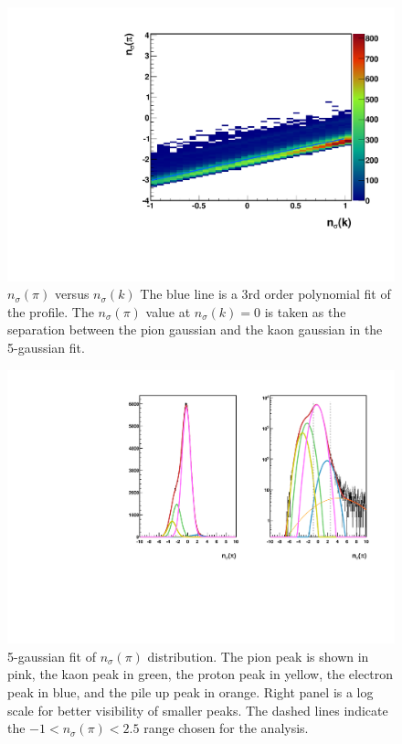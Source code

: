 \documentclass[abstract = on,listof=totoc, bibliography=totoc]{scrreprt}
\begin{document}
 \begin{figure}
\begin{center}
\includegraphics[width = .7\textwidth]{exampleNsigNsig.pdf}
\caption[$n_\sigma(\pi)$ versus $n_\sigma(k)$]{$n_\sigma(\pi)$ versus $n_\sigma(k)$ The blue line is a 3rd order polynomial fit of the profile. The $n_\sigma(\pi)$ value at $n_\sigma(k) = 0$ is taken as the separation between the pion gaussian and the kaon gaussian in the 5-gaussian fit.}
\label{fig:nSignSig}
\end{center}
\end{figure}



 \begin{figure}
\begin{center}
\includegraphics[width = 1\textwidth]{histogramExample2Fit.pdf}
\caption[5-gaussian fit of $n_\sigma(\pi)$ distribution]{5-gaussian fit of $n_\sigma(\pi)$ distribution. The pion peak is shown in pink, the kaon peak in green, the proton peak in yellow, the electron peak in blue, and the pile up peak in orange. Right panel is a log scale for better visibility of smaller peaks. The dashed lines indicate the $-1 < n_\sigma(\pi) < 2.5$ range chosen for the analysis.}
\label{fig:nSigExampleFit}
\end{center}
\end{figure}
\end{document}
